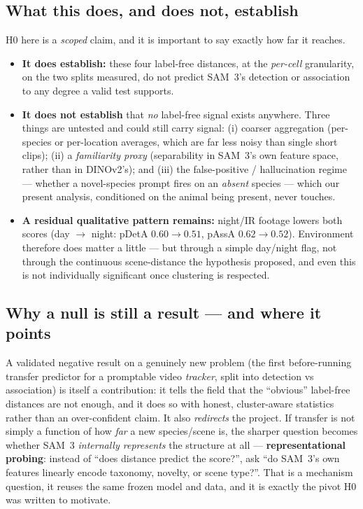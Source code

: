 \documentclass[11pt]{article}
\newcommand{\pdeta}{\textsf{pDetA}}
\newcommand{\passa}{\textsf{pAssA}}
\begin{document}
\subsection{What this does, and does not, establish}
H0 here is a \emph{scoped} claim, and it is important to say exactly how far it reaches.
\begin{itemize}[leftmargin=1.4em,itemsep=2pt]
  \item \textbf{It does establish:} these four label-free distances, at the \emph{per-cell} granularity,
        on the two splits measured, do not predict SAM~3's detection or association to any degree a valid
        test supports.
  \item \textbf{It does not establish} that \emph{no} label-free signal exists anywhere. Three things are
        untested and could still carry signal: (i) coarser aggregation (per-species or per-location
        averages, which are far less noisy than single short clips); (ii) a \emph{familiarity proxy}
        (separability in SAM~3's own feature space, rather than in DINOv2's); and (iii) the
        false-positive / hallucination regime --- whether a novel-species prompt fires on an
        \emph{absent} species --- which our present analysis, conditioned on the animal being present,
        never touches.
  \item \textbf{A residual qualitative pattern remains:} night/IR footage lowers both scores
        (day $\to$ night: \pdeta{} $0.60 \to 0.51$, \passa{} $0.62 \to 0.52$). Environment therefore does
        matter a little --- but through a simple day/night flag, not through the continuous scene-distance
        the hypothesis proposed, and even this is not individually significant once clustering is respected.
\end{itemize}

\subsection{Why a null is still a result --- and where it points}
A validated negative result on a genuinely new problem (the first before-running transfer predictor for a
promptable video \emph{tracker}, split into detection vs association) is itself a contribution: it tells
the field that the ``obvious'' label-free distances are not enough, and it does so with honest,
cluster-aware statistics rather than an over-confident claim. It also \emph{redirects} the project. If
transfer is not simply a function of how \emph{far} a new species/scene is, the sharper question becomes
whether SAM~3 \emph{internally represents} the structure at all --- \textbf{representational probing}:
instead of ``does distance predict the score?'', ask ``do SAM~3's own features linearly encode taxonomy,
novelty, or scene type?''. That is a mechanism question, it reuses the same frozen model and data, and it
is exactly the pivot H0 was written to motivate.
\end{document}
